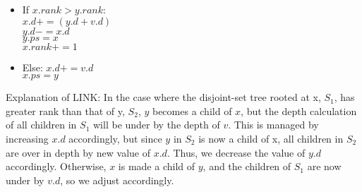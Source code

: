 \documentclass[letterpaper,10pt]{article}
\begin{document}
\begin{enumerate}
\begin{enumerate}
\begin{itemize}
\item If $x.rank > y.rank$: 
\\ $x.d += (y.d + v.d)$
\\ $y.d -= x.d$
\\ $y.ps = x$
\\ $x.rank += 1$
\item Else: $x.d += v.d$
\\ $x.ps = y$
\end{itemize}
Explanation of LINK: In the case where the disjoint-set tree rooted at x, $S_1$, has greater rank than that of y, $S_2$, $y$ becomes a child of $x$, but the depth calculation of all children in $S_1$ will be under by the depth of $v$. This is managed by increasing $x.d$ accordingly, but since $y$ in $S_2$ is now a child of x, all children in $S_2$ are over in depth by new value of $x.d$. Thus, we decrease the value of $y.d$ accordingly. Otherwise, $x$ is made a child of $y$, and the children of $S_1$ are now under by $v.d$, so we adjust accordingly. 
\end{enumerate}
\end{enumerate}
\end{document}
